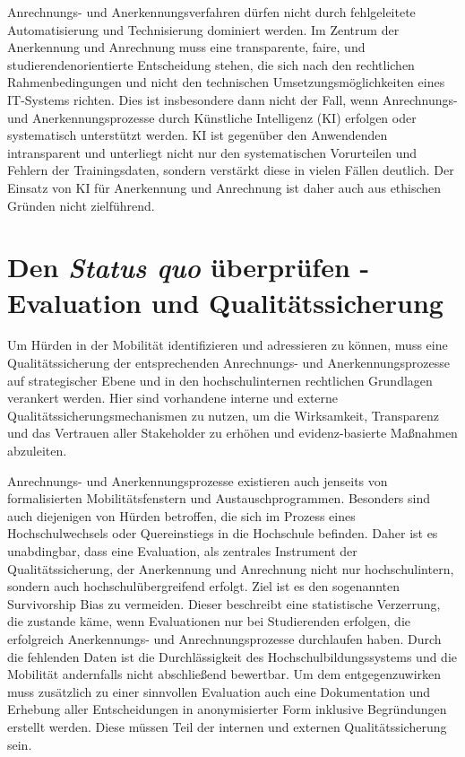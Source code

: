 \documentclass[DIV=calc]{scrartcl}
\begin{document}
Anrechnungs- und Anerkennungsverfahren dürfen nicht durch fehlgeleitete Automatisierung und Technisierung dominiert werden. Im Zentrum der Anerkennung und Anrechnung muss eine transparente, faire, und studierendenorientierte Entscheidung stehen, die sich nach den rechtlichen Rahmenbedingungen und nicht den technischen Umsetzungsmöglichkeiten eines IT-Systems richten. Dies ist insbesondere dann nicht der Fall, wenn Anrechnungs- und Anerkennungsprozesse durch Künstliche Intelligenz (KI) erfolgen oder systematisch unterstützt werden. KI ist gegenüber den Anwendenden intransparent und unterliegt nicht nur den systematischen Vorurteilen und Fehlern der Trainingsdaten, sondern verstärkt diese in vielen Fällen deutlich. Der Einsatz von KI für Anerkennung und Anrechnung ist daher auch aus ethischen Gründen nicht zielführend.

\section{Den \textit{Status quo} überprüfen - Evaluation und Qualitätssicherung}

Um Hürden in der Mobilität identifizieren und adressieren zu können, muss eine Qualitätssicherung der entsprechenden Anrechnungs- und Anerkennungsprozesse auf strategischer Ebene und in den hochschulinternen rechtlichen Grundlagen verankert werden. Hier sind vorhandene interne und externe Qualitätssicherungsmechanismen zu nutzen, um die Wirksamkeit, Transparenz und das Vertrauen aller Stakeholder zu erhöhen und evidenz-basierte Maßnahmen abzuleiten.

Anrechnungs- und Anerkennungsprozesse existieren auch jenseits von formalisierten Mobilitätsfenstern und Austauschprogrammen. Besonders sind auch diejenigen von Hürden betroffen, die sich im Prozess eines Hochschulwechsels oder Quereinstiegs in die Hochschule befinden. Daher ist es unabdingbar, dass eine Evaluation, als zentrales Instrument der Qualitätssicherung, der Anerkennung und Anrechnung nicht nur hochschulintern, sondern auch hochschulübergreifend erfolgt. Ziel ist es den sogenannten Survivorship Bias zu vermeiden. Dieser beschreibt eine statistische Verzerrung, die zustande käme, wenn Evaluationen nur bei Studierenden erfolgen, die erfolgreich Anerkennungs- und Anrechnungsprozesse durchlaufen haben. Durch die fehlenden Daten ist die Durchlässigkeit des Hochschulbildungssystems und die Mobilität andernfalls nicht abschließend bewertbar. Um dem entgegenzuwirken muss zusätzlich zu einer sinnvollen Evaluation auch eine Dokumentation und Erhebung aller Entscheidungen in anonymisierter Form inklusive Begründungen erstellt werden. Diese müssen Teil der internen und externen Qualitätssicherung sein.
\end{document}
